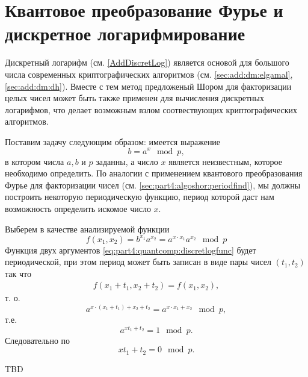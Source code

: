 \section{Квантовое преобразование Фурье и дискретное логарифмирование}
Дискретный логарифм (см. \autoref{AddDiscretLog}) является основой для
большого числа современных криптографических алгоритмов (см.
\autoref{sec:add:dm:elgamal}, \autoref{sec:add:dm:dh}). Вместе с тем 
метод предложеный Шором для факторизации целых чисел может быть также
применен для вычисления дискретных логарифмов, что делает возможным
взлом соотвествующих криптографических алгоритмов.

Поставим задачу следующим образом: имеется выражение 
\[
b = a^x \mod p,
\]
в котором числа $a, b$ и $p$ заданны, а число $x$ является
неизвестным, которое необходимо определить. По аналогии с применением
квантового преобразования Фурье для факторизации чисел (см.
\autoref{sec:part4:algoshor:periodfind}), мы должны
построить некоторую периодическую функцию, период которой даст нам
возможность определить искомое число $x$.

Выберем в качестве анализируемой функции
\begin{equation}
f\left(x_1, x_2\right) = b^{x_1}a^{x_2} = a^{x \cdot x_1} a^{x_2} \mod p
\label{eq:part4:quantcomp:discretlogfunc}
\end{equation}
Функция двух аргументов \eqref{eq:part4:quantcomp:discretlogfunc}
будет периодической, при этом период может быть записан в виде пары
чисел $(t_1, t_2)$ так что
\begin{eqnarray}
f\left(x_1 + t_1, x_2 + t_2\right) = f\left(x_1, x_2\right),
\nonumber
\end{eqnarray}
т. о. 
\[
a^{x \cdot \left( x_1 + t_1 \right) + x_2 + t_2} = a^{x \cdot x_1 + x_2}
\mod p,
\]
т.е. 
\[
a^{x t_1 + t_2} = 1 \mod p.
\]
Следовательно по 
\[
x t_1 + t_2 = 0 \mod p.
\]




TBD

